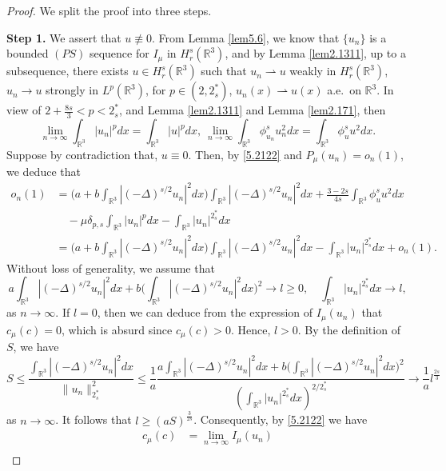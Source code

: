 \documentclass[reqno]{amsart}
\begin{document}
\begin{proof}  We split the proof into three steps.
\smallskip

\noindent\textbf{Step 1.} 
We assert that  $u\not\equiv 0$.
From Lemma {\ref{lem5.6}}, we  know that $\{u_n\}$ is a  bounded $(PS)$ sequence 
for $I_\mu$ in $H^s_r(\mathbb{R}^3)$, and by Lemma {\ref{lem2.1311}}, up to a 
subsequence, there exists $u\in H^s_r(\mathbb{R}^3)$ such that $u_n\rightharpoonup u$ 
weakly in $ H^s_r(\mathbb{R}^3)$, $u_n\to u$ strongly in $ L^p(\mathbb{R}^3)$, for 
$p\in (2, 2^*_s)$, $u_n(x)\rightharpoonup u(x)$ a.e.\ on $\mathbb{R}^3$. 
In view of $2+\frac{8s}{3}<p<2^*_s$, and Lemma {\ref{lem2.1311}} and  
Lemma {\ref{lem2.171}}, then
\begin{equation}\label{5.2122}
\lim_{n\to \infty}\int_{\mathbb{R}^3}|u_n|^pdx
=\int_{\mathbb{R}^3}|u|^pdx,~\lim_{n\to \infty}\int_{\mathbb{R}^3}
\phi^s_{u_n}u^2_ndx=\int_{\mathbb{R}^3}\phi^s_{u}u^2dx.
\end{equation}
Suppose by contradiction that, $u\equiv 0$. Then, by \eqref{5.2122} and 
$P_\mu(u_n)=o_n(1)$, we deduce that
\begin{align*}
o_n(1)&
= \Big(a+b\int_{\mathbb{R}^3}|(-\Delta)^{s/2}u_n|^2dx\Big)
 \int_{\mathbb{R}^3}|(-\Delta)^{s/2}u_n|^2dx
 +\frac{3-2s}{4s}\int_{\mathbb{R}^3}\phi^s_u u^2dx\\
&\quad -\mu \delta_{p,s}\int_{\mathbb{R}^3}|u_n|^pdx
 -\int_{\mathbb{R}^3}|u_n|^{2^*_s}dx\\
&= \Big(a+b\int_{\mathbb{R}^3}|(-\Delta)^{s/2}u_n|^2dx\Big)
 \int_{\mathbb{R}^3}|(-\Delta)^{s/2}u_n|^2dx
-\int_{\mathbb{R}^3}|u_n|^{2^*_s}dx+o_n(1).
\end{align*}
Without loss of generality, we assume that
$$
a\int_{\mathbb{R}^3}|(-\Delta)^{s/2}u_n|^2dx
+b\Big(\int_{\mathbb{R}^3}|(-\Delta)^{s/2}u_n|^2dx\Big)^2\to l\geq 0,\quad
\int_{\mathbb{R}^3}|u_n|^{2^*_s}dx\to l,
$$
as $n\to \infty$. If $l=0$, then we can deduce from the expression of $I_\mu(u_n)$ 
that $c_\mu(c)=0$, which is absurd since $c_\mu(c)>0$. Hence, $l>0$. 
By the definition of $S$, we have
$$
S\leq \frac{\int_{\mathbb{R}^3}|(-\Delta)^{s/2}u_n|^2dx}
{\|u_n\|^2_{2^*_s}}\leq \frac{1}{a}
\frac{a\int_{\mathbb{R}^3}|(-\Delta)^{s/2}u_n|^2dx
+b\Big(\int_{\mathbb{R}^3}|(-\Delta)^{s/2}u_n|^2dx\Big)^2}
{\left(\int_{\mathbb{R}^3}|u_n|^{2^*_s}
dx\right)^{2/2^*_s}}
\to \frac{1}{a}l^{\frac{2s}{3}}
$$
as $n\to \infty $. It follows that $l\geq (aS)^{\frac{3}{2s}}$. Consequently,
 by \eqref{5.2122} we have
\begin{align*}
c_\mu(c)
&= \lim_{n\to \infty}I_\mu(u_n)\\

\end{align*}
\end{proof}
\end{document}
